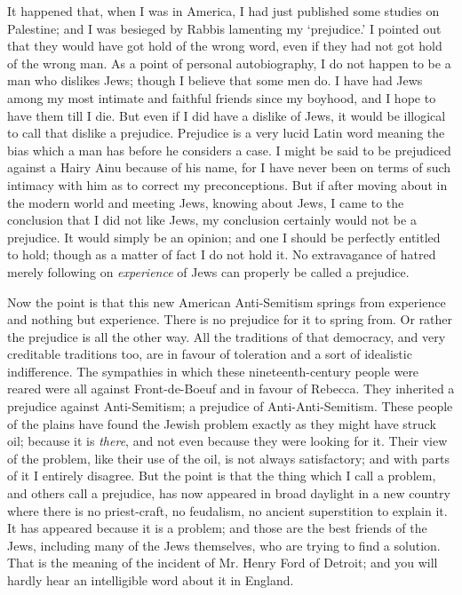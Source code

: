 \documentclass{book}
\begin{document}
It happened that, when I was in America, I had just published some studies on Palestine; and I was besieged by Rabbis lamenting my ‘prejudice.’ I pointed out that they would have got hold of the wrong word, even if they had not got hold of the wrong man. As a point of personal autobiography, I do not happen to be a man who dislikes Jews; though I believe that some men do. I have had Jews among my most intimate and faithful friends since my boyhood, and I hope to have them till I die. But even if I did have a dislike of Jews, it would be illogical to call that dislike a prejudice. Prejudice is a very lucid Latin word meaning the bias which a man has before he considers a case. I might be said to be prejudiced against a Hairy Ainu because of his name, for I have never been on terms of such intimacy with him as to correct my preconceptions. But if after moving about in the modern world and meeting Jews, knowing about Jews, I came to the conclusion that I did not like Jews, my conclusion certainly would not be a prejudice. It would simply be an opinion; and one I should be perfectly entitled to hold; though as a matter of fact I do not hold it. No extravagance of hatred merely following on \emph{experience} of Jews can properly be called a prejudice.

Now the point is that this new American Anti-Semitism springs from experience and nothing but experience. There is no prejudice for it to spring from. Or rather the prejudice is all the other way. All the traditions of that democracy, and very creditable traditions too, are in favour of toleration and a sort of idealistic indifference. The sympathies in which these nineteenth-century people were reared were all against Front-de-Boeuf and in favour of Rebecca. They inherited a prejudice against Anti-Semitism; a prejudice of Anti-Anti-Semitism. These people of the plains have found the Jewish problem exactly as they might have struck oil; because it is \emph{there}, and not even because they were looking for it. Their view of the problem, like their use of the oil, is not always satisfactory; and with parts of it I entirely disagree. But the point is that the thing which I call a problem, and others call a prejudice, has now appeared in broad daylight in a new country where there is no priest-craft, no feudalism, no ancient superstition to explain it. It has appeared because it is a problem; and those are the best friends of the Jews, including many of the Jews themselves, who are trying to find a solution. That is the meaning of the incident of Mr. Henry Ford of Detroit; and you will hardly hear an intelligible word about it in England.
\end{document}

